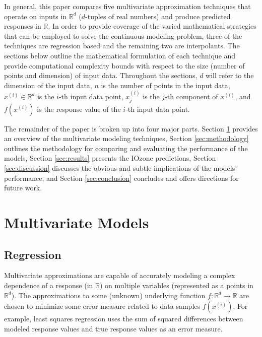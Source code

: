 \documentclass{scspaperproc}
\theoremstyle{scsthe}
\begin{document}


In general, this paper compares five multivariate approximation
techniques that operate on inputs in $\mathbb{R}^d$ ($d$-tuples of
real numbers) and produce predicted responses in $\mathbb{R}$. In
order to provide coverage of the varied mathematical strategies that
can be employed to solve the continuous modeling problem, three of the
techniques are regression based and the remaining two are
interpolants. The sections below outline the mathematical formulation
of each technique and provide computational complexity bounds with
respect to the size (number of points and dimension) of input
data. Throughout the sections, $d$ will refer to the dimension of the
input data, $n$ is the number of points in the input data, $x^{(i)}
\in \mathbb{R}^d$ is the $i$-th input data point, $x^{(i)}_j$ is the
$j$-th component of $x^{(i)}$, and $f(x^{(i)})$ is the response value
of the $i$-th input data point.

The remainder of the paper is broken up into four major parts. Section
\ref{sec:multivariate} provides an overview of the multivariate
modeling techniques, Section \ref{sec:methodology} outlines the
methodology for comparing and evaluating the performance of the
models, Section \ref{sec:results} presents the IOzone predictions,
Section \ref{sec:discussion} discusses the obvious and subtle
implications of the models' performance, and Section
\ref{sec:conclusion} concludes and offers directions for future work.

\section{Multivariate Models}
\label{sec:multivariate}

\subsection{Regression}
Multivariate approximations are capable of accurately modeling a
complex dependence of a response (in $\mathbb{R}$) on multiple
variables (represented as a points in $\mathbb{R}^{d}$). The
approximations to some (unknown) underlying function $f: \mathbb{R}^d
\rightarrow \mathbb{R}$ are chosen to minimize some error measure
related to data samples $f(x^{(i)})$. For example, least squares
regression uses the sum of squared differences between modeled
response values and true response values as an error measure.
\end{document}
